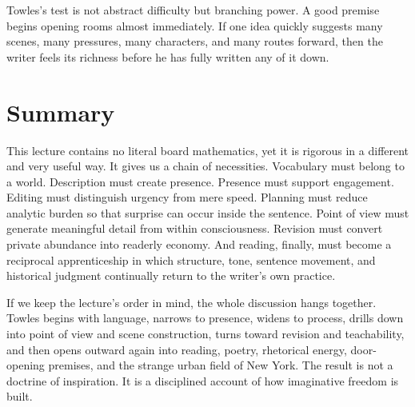 Towles's test is not abstract difficulty but branching power. A good premise begins opening rooms almost immediately. If one idea quickly suggests many scenes, many pressures, many characters, and many routes forward, then the writer feels its richness before he has fully written any of it down.

\section{Summary}

This lecture contains no literal board mathematics, yet it is rigorous in a different and very useful way. It gives us a chain of necessities. Vocabulary must belong to a world. Description must create presence. Presence must support engagement. Editing must distinguish urgency from mere speed. Planning must reduce analytic burden so that surprise can occur inside the sentence. Point of view must generate meaningful detail from within consciousness. Revision must convert private abundance into readerly economy. And reading, finally, must become a reciprocal apprenticeship in which structure, tone, sentence movement, and historical judgment continually return to the writer's own practice.

If we keep the lecture's order in mind, the whole discussion hangs together. Towles begins with language, narrows to presence, widens to process, drills down into point of view and scene construction, turns toward revision and teachability, and then opens outward again into reading, poetry, rhetorical energy, door-opening premises, and the strange urban field of New York. The result is not a doctrine of inspiration. It is a disciplined account of how imaginative freedom is built.